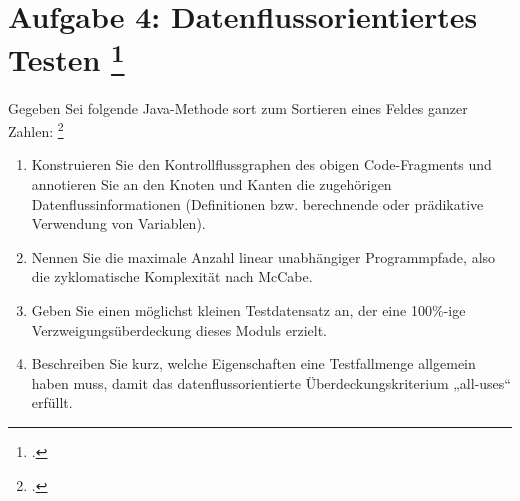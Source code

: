 \documentclass{lehramt-informatik-aufgabe}
\begin{document}
\section{Aufgabe 4: Datenflussorientiertes Testen
\footcite{sosy:ab:7}}

Gegeben Sei folgende Java-Methode sort zum Sortieren eines Feldes ganzer
Zahlen:
\footcite[Thema 1 Teilaufgabe 2 Aufgabe 3]{examen:66116:2016:09}


\begin{enumerate}


\item Konstruieren Sie den
Kontrollflussgraphen
des obigen Code-Fragments und annotieren Sie an den Knoten und Kanten
die zugehörigen Datenflussinformationen (Definitionen bzw. berechnende
oder prädikative Verwendung von Variablen).


\item Nennen Sie die maximale Anzahl linear unabhängiger Programmpfade,
also die zyklomatische Komplexität nach McCabe.


\item Geben Sie einen möglichst kleinen Testdatensatz an, der eine
100\%-ige Verzweigungsüberdeckung dieses Moduls erzielt.


\item Beschreiben Sie kurz, welche Eigenschaften eine Testfallmenge
allgemein haben muss, damit das datenflussorientierte
Überdeckungskriterium „all-uses“ erfüllt.

\end{enumerate}
\end{document}
